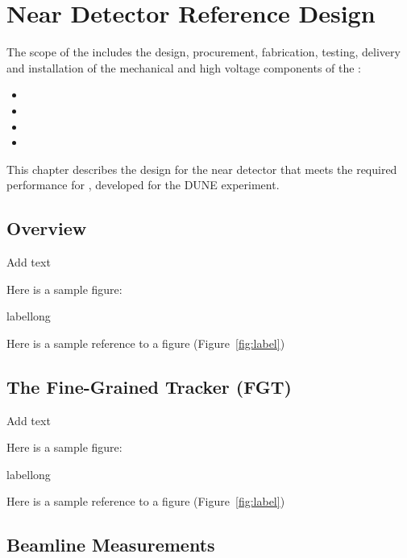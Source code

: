 \chapter{Near Detector Reference Design}
\label{ch:nd-ref}

The scope of the \fixme{} includes the design, procurement, fabrication, testing, delivery and installation of the mechanical and high voltage components of the \fixme{}: 
\begin{itemize}
\item  
\item 
\item 
\item 
\end{itemize}
This chapter describes the design for the near detector that meets the required performance for \fixme{}, developed for the DUNE experiment.

\section{Overview}
\label{sec:nd-ref-ov}

Add text

Here is a sample figure: 

\begin{cdrfigure}[short]{label}{long}
\end{cdrfigure}


Here is a sample reference to a figure (Figure~\ref{fig:label})


\section{The Fine-Grained Tracker (FGT)} 
\label{sec:nd-ref-fgt}

Add text

Here is a sample figure: 

\begin{cdrfigure}[short]{label}{long}
\end{cdrfigure}


Here is a sample reference to a figure (Figure~\ref{fig:label})

\section{Beamline Measurements} 
\label{sec:nd-ref-blm}

